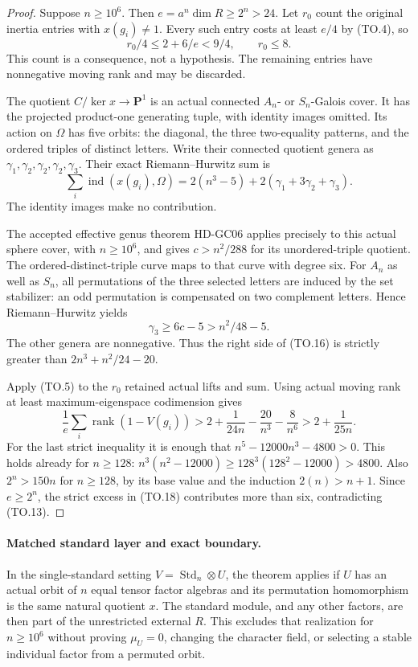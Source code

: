 \begin{proof}
Suppose \(n\ge10^6\). Then \(e=a^n\dim R\ge2^n>24\).
Let \(r_0\) count the original inertia entries with \(x(g_i)\ne1\).
Every such entry costs at least \(e/4\) by (TO.4), so
\[
            r_0/4\le2+6/e<9/4,\qquad r_0\le8.
 \tag{TO.15}
\]
This count is a consequence, not a hypothesis. The remaining
entries have nonnegative moving rank and may be discarded.

The quotient \(C/\ker x\longrightarrow\mathbf P^1\) is an actual
connected \(A_n\)- or \(S_n\)-Galois cover. It has the projected
product-one generating tuple, with identity images omitted.
Its action on \(\Omega\) has five orbits: the diagonal, the three
two-equality patterns, and the ordered triples of distinct letters.
Write their connected quotient genera as
\(\gamma_1,\gamma_2,\gamma_2,\gamma_2,\gamma_3\).
Their exact Riemann--Hurwitz sum is
\[
 \sum_i\operatorname{ind}(x(g_i),\Omega)
        =2(n^3-5)+2(\gamma_1+3\gamma_2+\gamma_3).
 \tag{TO.16}
\]
The identity images make no contribution.

The accepted effective genus theorem HD-GC06 applies precisely to
this actual sphere cover, with \(n\ge10^6\), and gives
\(c>n^2/288\) for its unordered-triple quotient.
The ordered-distinct-triple curve maps to that curve with degree
six. For \(A_n\) as well as \(S_n\), all permutations of the three
selected letters are induced by the set stabilizer: an odd
permutation is compensated on two complement letters. Hence
Riemann--Hurwitz yields
\[
                  \gamma_3\ge6c-5>n^2/48-5.
 \tag{TO.17}
\]
The other genera are nonnegative. Thus the right side of
(TO.16) is strictly greater than \(2n^3+n^2/24-20\).

Apply (TO.5) to the \(r_0\) retained actual lifts and sum. Using
actual moving rank at least maximum-eigenspace codimension gives
\[
 \frac1e\sum_i\operatorname{rank}(1-V(g_i))
  >2+\frac1{24n}-\frac{20}{n^3}-\frac8{n^6}
  >2+\frac1{25n}.
 \tag{TO.18}
\]
For the last strict inequality it is enough that
\(n^5-12000n^3-4800>0\). This holds already for \(n\ge128\):
\(n^3(n^2-12000)\ge128^3(128^2-12000)>4800\).
Also \(2^n>150n\) for \(n\ge128\), by its base value and the
induction \(2(n)>n+1\). Since \(e\ge2^n\), the strict excess
in (TO.18) contributes more than six, contradicting (TO.13).
\end{proof}

\paragraph{Matched standard layer and exact boundary.}
In the single-standard setting \(V=\operatorname{Std}_n\otimes U\),
the theorem applies if \(U\) has an actual orbit of \(n\) equal
tensor factor algebras and its permutation homomorphism is the
same natural quotient \(x\). The standard module, and any other
factors, are then part of the unrestricted external \(R\).
This excludes that realization for \(n\ge10^6\) without proving
\(\mu_U=0\), changing the character field, or selecting a stable
individual factor from a permuted orbit.

